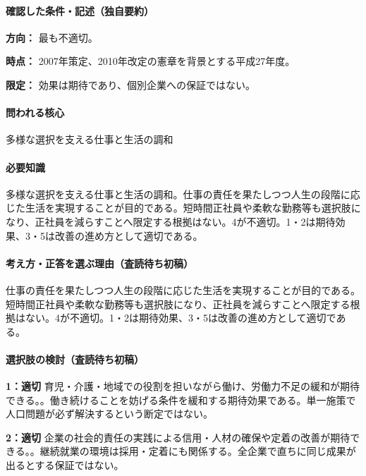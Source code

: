 \paragraph{確認した条件・記述（独自要約）}\mbox{}\par

\noindent\textbf{方向：} 最も不適切。\par

\noindent\textbf{時点：} 2007年策定、2010年改定の憲章を背景とする平成27年度。\par

\noindent\textbf{限定：} 効果は期待であり、個別企業への保証ではない。\par

\paragraph{問われる核心} 多様な選択を支える仕事と生活の調和

\paragraph{必要知識} 多様な選択を支える仕事と生活の調和。仕事の責任を果たしつつ人生の段階に応じた生活を実現することが目的である。短時間正社員や柔軟な勤務等も選択肢になり、正社員を減らすことへ限定する根拠はない。4が不適切。1・2は期待効果、3・5は改善の進め方として適切である。

\paragraph{考え方・正答を選ぶ理由（査読待ち初稿）} 仕事の責任を果たしつつ人生の段階に応じた生活を実現することが目的である。短時間正社員や柔軟な勤務等も選択肢になり、正社員を減らすことへ限定する根拠はない。4が不適切。1・2は期待効果、3・5は改善の進め方として適切である。

\paragraph{選択肢の検討（査読待ち初稿）}\mbox{}\par

\noindent\textbf{1：適切} 育児・介護・地域での役割を担いながら働け、労働力不足の緩和が期待できる。。働き続けることを妨げる条件を緩和する期待効果である。単一施策で人口問題が必ず解決するという断定ではない。\par

\noindent\textbf{2：適切} 企業の社会的責任の実践による信用・人材の確保や定着の改善が期待できる。。継続就業の環境は採用・定着にも関係する。全企業で直ちに同じ成果が出るとする保証ではない。\par

